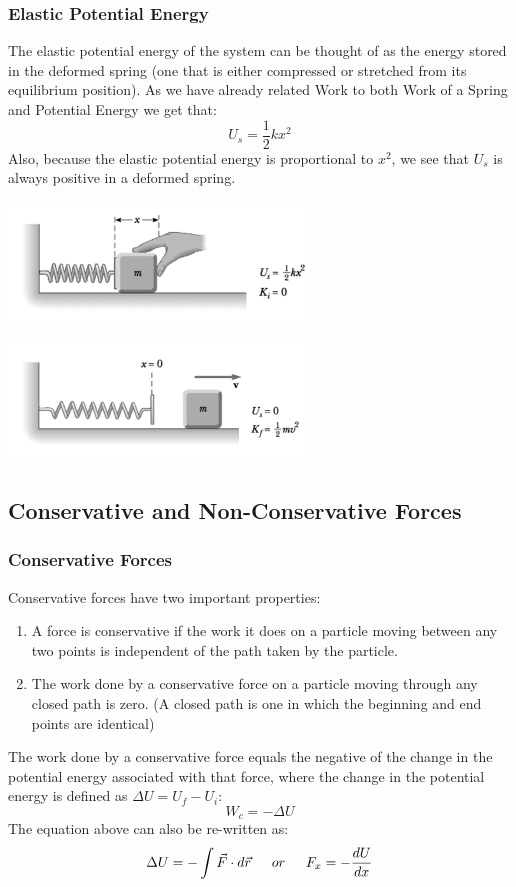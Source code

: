 \documentclass{article}
\begin{document}
		\subsubsection{Elastic Potential Energy}
        	The elastic potential energy of the system can be thought of as the energy stored in the deformed spring (one that is either compressed or stretched from its equilibrium position). As we have already related Work to both Work of a Spring and Potential Energy we get that:
            \[
            	U_s=\frac{1}{2}kx^2
            \]
            Also, because the elastic potential energy is proportional to $x^2$, we see that $U_s$ is always positive in a deformed spring.
            \begin{multicols}{2}
            	\centerline{\includegraphics[width=8cm]{p1.png}}
                \columnbreak
                \centerline{\includegraphics[width=8cm]{p2.png}}
            \end{multicols}
	\subsection{Conservative and Non-Conservative Forces}
    	\subsubsection{Conservative Forces}
        	Conservative forces have two important properties:\\
            \begin{enumerate}
            	\item A force is conservative if the work it does on a particle moving between any two points is independent of the path taken by the particle.
                \item The work done by a conservative force on a particle moving through any closed path is zero. (A closed path is one in which the beginning and end points are identical)
            \end{enumerate}
            The work done by a conservative force equals the negative of the change in the potential energy associated with that force, where the change in the potential energy is defined as $\Delta U=U_f-U_i$:
            \[
            	W_c=-\Delta U
            \]
            The equation above can also be re-written as:
            \[
            	\Delta U=-\int \vec{F}\cdot d\vec{r} \indent
                or \indent
                F_x=-\frac{dU}{dx}
            \]
\end{document}
